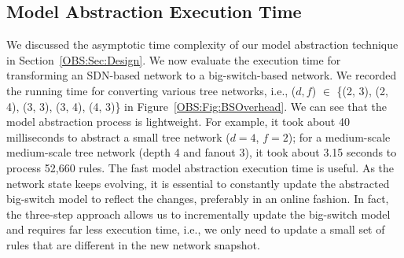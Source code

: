 \subsection{Model Abstraction Execution Time}
We discussed the asymptotic time complexity of our model abstraction technique in 
Section~\ref{OBS:Sec:Design}.
We now evaluate the execution time for transforming an SDN-based network to a big-switch-based network.
We recorded the running time for converting various tree networks,
i.e., ($d, f$) $\in$ \{(2, 3), (2, 4), (3, 3), (3, 4), (4, 3)\} in Figure~\ref{OBS:Fig:BSOverhead}.
We can see that the model abstraction process is lightweight.
For example, it took about 40 milliseconds to abstract a small tree network ($d=4$, $f=2$);
for a medium-scale medium-scale tree network (depth 4 and fanout 3),
it took about 3.15 seconds to process 52,660 rules.
The fast model abstraction execution time is useful.
As the network state keeps evolving, it is essential to constantly update the abstracted big-switch model to reflect the changes, preferably in an online fashion.
In fact, the three-step approach allows us to incrementally update the big-switch model and requires far less execution time, i.e.,
we only need to update a small set of rules that are different in the new network snapshot.
